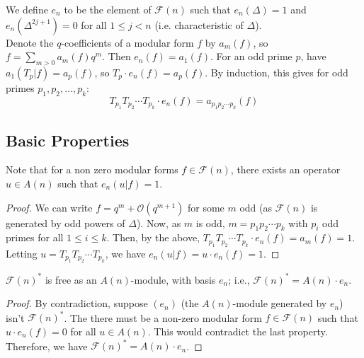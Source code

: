 We define $e_n$ to be the element of $\mathcal{F}(n)$ such that $e_n(\Delta) = 1$ and $e_n(\Delta^{2j+1}) = 0$ for all $1 \leq j <n$ (i.e. characteristic of $\Delta$).\\
Denote the $q$-coefficients of a modular form $f$ by $a_m(f)$, so $f = \sum_{m>0} a_m(f)q^m$.
Then $e_n(f) = a_1(f)$.
For an odd prime $p$, have $a_1(T_p|f) = a_p(f)$, so $T_p \cdot e_n(f) = a_p(f)$.
By induction, this gives for odd primes $p_1, p_2, \dots, p_k$:
$$
T_{p_1} T_{p_2} \cdots T_{p_k} \cdot e_n(f) 
= a_{p_1 p_2\cdots p_k}(f)
$$

\subsection{Basic Properties}

\begin{property}
	Note that for a non zero modular forms $f \in \mathcal{F}(n)$, there exists an operator $u \in A(n)$ such that $e_n(u|f) = 1$.
\end{property}
\begin{proof}
	We can write $f = q^m + \mathcal{O}(q^{m+1})$ for some $m$ odd (as $\mathcal{F}(n)$ is generated by odd powers of $\Delta$).
	Now, as $m$ is odd, $m=p_1 p_2 \cdots p_k$ with $p_i$ odd primes for all $1 \leq i \leq k$.
	Then, by the above, $T_{p_1} T_{p_2} \cdots T_{p_k} \cdot e_n(f) = a_m(f) = 1$.
	Letting $u = T_{p_1} T_{p_2} \cdots T_{p_k}$, we have $e_n(u|f) = u \cdot e_n(f) = 1$.
\end{proof}

\begin{property}
	$\mathcal{F}(n)^*$ is free as an $A(n)$-module, with basis $e_n$;	
	i.e., $\mathcal{F}(n)^* = A(n) \cdot e_n$.
\end{property}
\begin{proof}
	By contradiction, suppose $(e_n)$ (the $A(n)$-module generated by $e_n$) isn't $\mathcal{F}(n)^*$.
	The there must be a non-zero modular form $f \in \mathcal{F}(n)$ such that $u \cdot e_n(f)=0$ for all $u \in A(n)$.
	This would contradict the last property.
	Therefore, we have $\mathcal{F}(n)^* = A(n) \cdot e_n$.
\end{proof}

